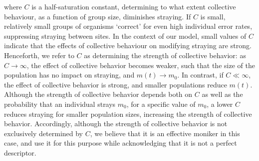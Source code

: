 \documentclass{revtex4}
\begin{document}
\noindent where $C$ is a half-saturation constant, determining to what extent collective behaviour, as a function of group size, diminishes straying.
If $C$ is small, relatively small groups of organisms `correct' for even high individual error rates, suppressing straying between sites.
In the context of our model, small values of $C$ indicate that the effects of collective behaviour on modifying straying are strong.
Henceforth, we refer to $C$ as determining the strength of collective behavior: as $C\rightarrow\infty$, the effect of collective behavior becomes weaker, such that the size of the population has no impact on straying, and $m(t)\rightarrow m_0$.
In contrast, if $C \ll \infty$, the effect of collective behavior is strong, and smaller populations reduce $m(t)$.
Although the strength of collective behavior depends both on $C$ as well as the probability that an individual strays $m_0$, for a specific value of $m_0$, a lower $C$ reduces straying for smaller population sizes, increasing the strength of collective behavior.
Accordingly, although the strength of collective behavior is not exclusively determined by $C$, we believe that it is an effective moniker in this case, and use it for this purpose while acknowledging that it is not a perfect descriptor.
\end{document}
